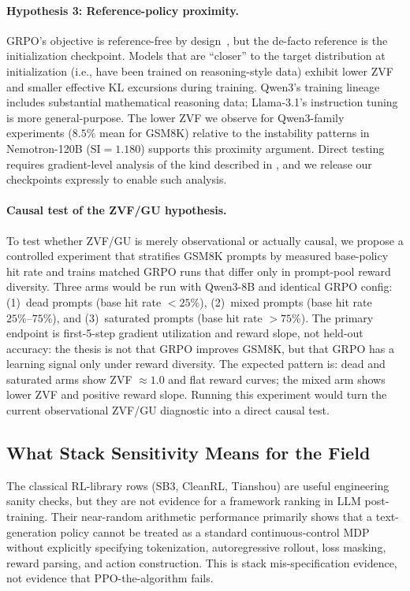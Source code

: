 \documentclass{article}
\begin{document}
\paragraph{Hypothesis 3: Reference-policy proximity.}
GRPO's objective is reference-free by design~\citep{shao2024deepseekmath},
but the de-facto reference is the initialization checkpoint.
Models that are ``closer'' to the target distribution at initialization (i.e.,
have been trained on reasoning-style data) exhibit lower ZVF and smaller
effective KL excursions during training.
Qwen3's training lineage includes substantial mathematical reasoning data;
Llama-3.1's instruction tuning is more general-purpose.
The lower ZVF we observe for Qwen3-family experiments ($8.5\%$ mean for GSM8K)
relative to the instability patterns in Nemotron-120B ($\text{SI} = 1.180$)
supports this proximity argument.
Direct testing requires gradient-level analysis of the kind described in
\citet{liu2025rlsubnetworks}, and we release our checkpoints expressly to
enable such analysis.

\paragraph{Causal test of the ZVF/GU hypothesis.}
To test whether ZVF/GU is merely observational or actually causal, we propose
a controlled experiment that stratifies GSM8K prompts by measured base-policy
hit rate and trains matched GRPO runs that differ only in prompt-pool reward
diversity.  Three arms would be run with Qwen3-8B and identical GRPO config:
(1)~dead prompts (base hit rate $<25\%$), (2)~mixed prompts (base hit rate
$25\%\text{--}75\%$), and (3)~saturated prompts (base hit rate $>75\%$).
The primary endpoint is first-5-step gradient utilization and reward slope,
not held-out accuracy: the thesis is not that GRPO improves GSM8K, but that
GRPO has a learning signal only under reward diversity.  The expected pattern
is: dead and saturated arms show ZVF $\approx 1.0$ and flat reward curves;
the mixed arm shows lower ZVF and positive reward slope.  Running this
experiment would turn the current observational ZVF/GU diagnostic into a
direct causal test.

\subsection{What Stack Sensitivity Means for the Field}
\label{sec:discuss_impl}

The classical RL-library rows (SB3, CleanRL, Tianshou) are useful engineering
sanity checks, but they are not evidence for a framework ranking in LLM
post-training.  Their near-random arithmetic performance primarily shows that
a text-generation policy cannot be treated as a standard continuous-control
MDP without explicitly specifying tokenization, autoregressive rollout,
loss masking, reward parsing, and action construction.  This is stack
mis-specification evidence, not evidence that PPO-the-algorithm fails.
\end{document}

